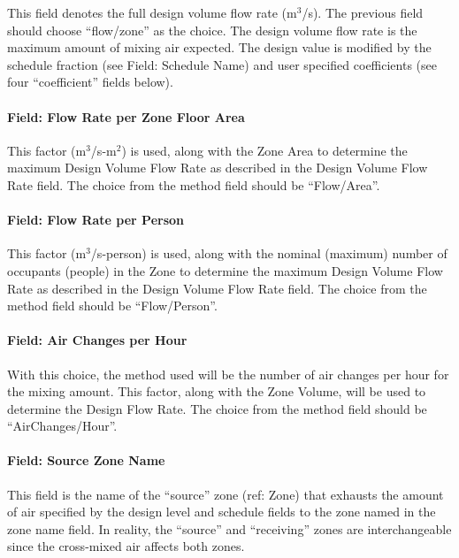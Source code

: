 This field denotes the full design volume flow rate (m\(^{3}\)/s). The previous field should choose ``flow/zone'' as the choice. The design volume flow rate is the maximum amount of mixing air expected. The design value is modified by the schedule fraction (see Field: Schedule Name) and user specified coefficients (see four ``coefficient'' fields below).

\paragraph{Field: Flow Rate per Zone Floor Area}\label{field-flow-rate-per-zone-floor-area-2}

This factor (m\(^{3}\)/s-m\(^{2}\)) is used, along with the Zone Area to determine the maximum Design Volume Flow Rate as described in the Design Volume Flow Rate field. The choice from the method field should be ``Flow/Area''.

\paragraph{Field: Flow Rate per Person}\label{field-flow-rate-per-person-2}

This factor (m\(^{3}\)/s-person) is used, along with the nominal (maximum) number of occupants (people) in the Zone to determine the maximum Design Volume Flow Rate as described in the Design Volume Flow Rate field. The choice from the method field should be ``Flow/Person''.

\paragraph{Field: Air Changes per Hour}\label{field-air-changes-per-hour-3}

With this choice, the method used will be the number of air changes per hour for the mixing amount. This factor, along with the Zone Volume, will be used to determine the Design Flow Rate. The choice from the method field should be ``AirChanges/Hour''.

\paragraph{Field: Source Zone Name}\label{field-source-zone-name-1}

This field is the name of the ``source'' zone (ref: Zone) that exhausts the amount of air specified by the design level and schedule fields to the zone named in the zone name field. In reality, the ``source'' and ``receiving'' zones are interchangeable since the cross-mixed air affects both zones.

